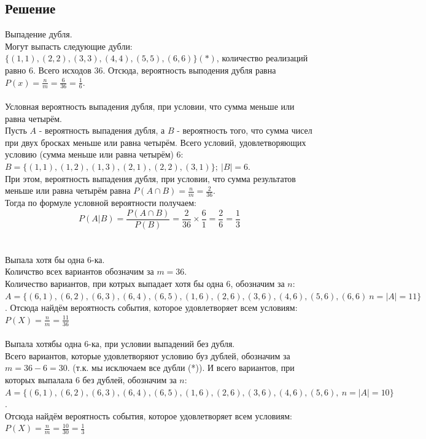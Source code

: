 \documentclass{article}
\begin{document}
\subsection*{Решение}
Выпадение дубля.\\
Могут выпасть следующие дубли: $\{ (1,1), (2,2), (3,3), (4,4), (5,5), (6,6) \}(*)$, количество реализаций равно 6. Всего исходов 36. Отсюда, вероятность выподения дубля равна $P(x) = \frac{n}{m}=\frac{6}{36} = \frac{1}{6}$.\\
\\
Условная вероятность выпадения дубля, при условии, что сумма меньше или равна четырём.\\
Пусть $A$ - вероятность выпадения дубля, а $B$ - вероятность того, что сумма чисел при двух бросках меньше или равна четырём. Всего условий, удовлетворяющих условию (сумма меньше или равна четырём) 6: $B=\{ (1,1), (1,2), (1,3), (2,1), (2,2), (3,1)\}; \ |B| = 6$.\\
При этом, вероятность выпадения дубля, при условии, что сумма результатов меньше или равна четырём равна $P(A \cap B) = \frac{n}{m} = \frac{2}{36}$.\\
Тогда по формуле условной вероятности получаем:\\
\[
    P(A|B) = \frac{P(A \cap B)}{P(B)} = \frac{2}{36} \times \frac{6}{1} = \frac{2}{6} = \frac{1}{3}
\]\\
\\
Выпала хотя бы одна 6-ка.\\
Количство всех вариантов обозначим за $m = 36$.\\
Количество вариантов, при котрых выпадает хотя бы одна 6, обозначим за $n$:\\ $A =\{ (6, 1), (6, 2), (6, 3), (6, 4), (6, 5), (1, 6), (2, 6), (3,6), (4, 6), (5,6), (6,6) \ n = |A| = 11\}$.
Отсюда найдём вероятность события, которое удовлетворяет всем условиям: $P(X) = \frac{n}{m} = \frac{11}{36}$ \\
\\
Выпала хотябы одна 6-ка, при условии выпадений без дубля.\\
Всего вариантов, которые удовлетворяют условию буз дублей, обозначим за $m = 36 - 6 = 30$. (т.к. мы исключаем все дубли (*)). И всего вариантов, при которых выпалала 6 без дублей, обозначим за $n$: $A = \{  (6, 1), (6, 2), (6, 3), (6, 4), (6, 5), (1, 6), (2, 6), (3,6), (4, 6), (5,6), \ n = |A| = 10\}$.\\
Отсюда найдём вероятность события, которое удовлетворяет всем условиям: $P(X) = \frac{n}{m} = \frac{10}{30} = \frac{1}{3}$ 
\end{document}
